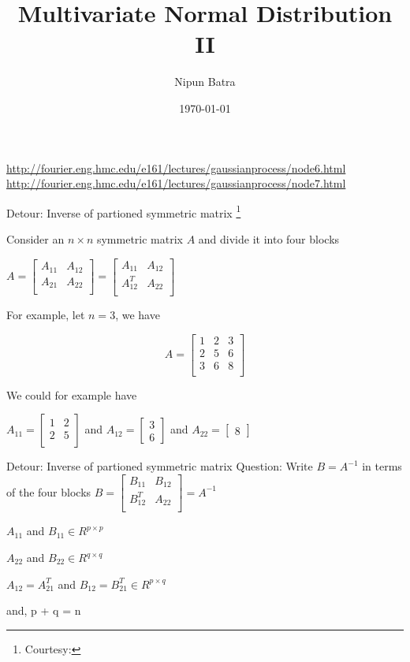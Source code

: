 \documentclass{beamer}
\title{Multivariate Normal Distribution II}
\date{\today}
\author{Nipun Batra}
\institute{IIT Gandhinagar}
\begin{document}
	\maketitle
	
	\urldef\nodeSix\url{http://fourier.eng.hmc.edu/e161/lectures/gaussianprocess/node6.html}
	\urldef\nodeSeven\url{http://fourier.eng.hmc.edu/e161/lectures/gaussianprocess/node7.html}

	\begin{frame}{Detour: Inverse of partioned symmetric matrix \footnote{Courtesy: \nodeSix}}
		
		Consider an $n\times n$ symmetric matrix $A$ and divide it into four blocks
		
		$
		A = \begin{bmatrix}
		A_{11} & A_{12}\\
		A_{21} & A_{22} \\
		\end{bmatrix} =  \begin{bmatrix}
		A_{11} & A_{12}\\
		A_{12}^T & A_{22} \\
		\end{bmatrix}
		$
		
		For example, let $n=3$, we have
		
		$$
		A =  \begin{bmatrix}
		1 & 2 & 3\\
		2 & 5 & 6 \\
		3 & 6 & 8 \\
		
	\end{bmatrix}
	$$
	
	We could for example have 
	
	$A_{11} = \begin{bmatrix}
	1 & 2 \\
	2 & 5 \\
	\end{bmatrix}$ and $A_{12} = \begin{bmatrix}
	3 \\ 6
	\end{bmatrix}
	$ and $A_{22} = \begin{bmatrix}
	8
	\end{bmatrix}$
\end{frame}

\begin{frame}{Detour: Inverse of partioned symmetric matrix}
	Question: Write $B = A^{-1}$ in terms of the four blocks
	$
	B = \begin{bmatrix}
	B_{11} & B_{12}\\
	B_{12}^T & A_{22} \\
	\end{bmatrix}
	= A^{-1}$
	
	$A_{11}$ and $B_{11} \in R^{p\times p}$ 
	
	$A_{22}$ and $B_{22} \in R^{q\times q}$
	
	$A_{12} = A_{21}^T$ and $B_{12} = B_{21}^T \in R^{p\times q}$
	
	and, p + q = n 
	
\end{frame}
\end{document}
